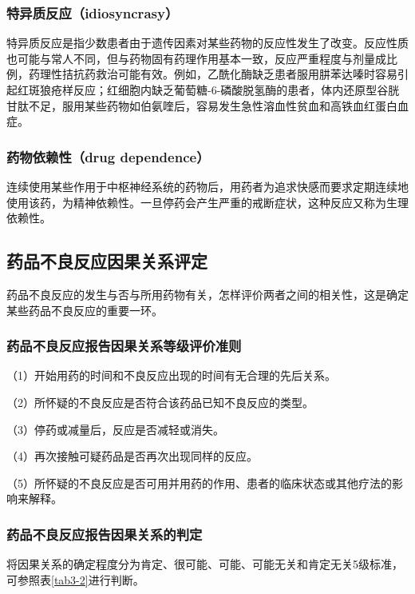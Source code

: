 \subsubsection{特异质反应（idiosyncrasy）}

特异质反应是指少数患者由于遗传因素对某些药物的反应性发生了改变。反应性质也可能与常人不同，但与药物固有药理作用基本一致，反应严重程度与剂量成比例，药理性拮抗药救治可能有效。例如，乙酰化酶缺乏患者服用肼苯达嗪时容易引起红斑狼疮样反应；红细胞内缺乏葡萄糖-6-磷酸脱氢酶的患者，体内还原型谷胱甘肽不足，服用某些药物如伯氨喹后，容易发生急性溶血性贫血和高铁血红蛋白血症。

\subsubsection{药物依赖性（drug dependence）}

连续使用某些作用于中枢神经系统的药物后，用药者为追求快感而要求定期连续地使用该药，为精神依赖性。一旦停药会产生严重的戒断症状，这种反应又称为生理依赖性。

\subsection{药品不良反应因果关系评定}

药品不良反应的发生与否与所用药物有关，怎样评价两者之间的相关性，这是确定某些药品不良反应的重要一环。

\subsubsection{药品不良反应报告因果关系等级评价准则}

（1）开始用药的时间和不良反应出现的时间有无合理的先后关系。

（2）所怀疑的不良反应是否符合该药品已知不良反应的类型。

（3）停药或减量后，反应是否减轻或消失。

（4）再次接触可疑药品是否再次出现同样的反应。

（5）所怀疑的不良反应是否可用并用药的作用、患者的临床状态或其他疗法的影响来解释。

\subsubsection{药品不良反应报告因果关系的判定}

将因果关系的确定程度分为肯定、很可能、可能、可能无关和肯定无关5级标准，可参照表\ref{tab3-2}进行判断。


